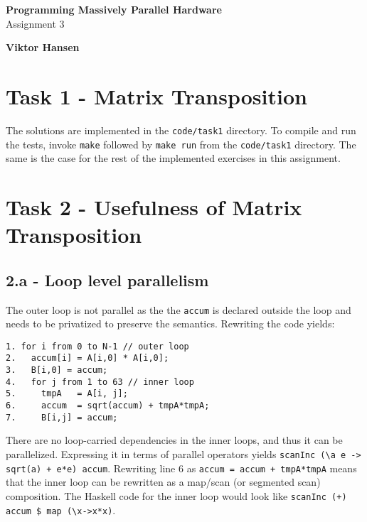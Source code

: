 \documentclass[11pt,a4paper,english]{article}
\begin{document}
\thispagestyle{empty} %
\hspace{6cm} \vspace{6cm}
\begin{center}
\textbf{\Huge {Programming Massively Parallel Hardware}}\\ \vspace{0.5cm}
\Large{Assignment 3}
\end{center}
\vspace{3cm}
\begin{center}
\Large{\textbf{Viktor Hansen}}
\end{center}
\vspace{6.0cm}
\thispagestyle{empty}

\newpage

\section*{Task 1 - Matrix Transposition}
The solutions are implemented in the \texttt{code/task1} directory. To compile and run the tests, invoke \texttt{make} followed by \texttt{make run} from the \texttt{code/task1} directory. The same is the case for the rest of the implemented exercises in this assignment.

\section*{Task 2 - Usefulness of Matrix Transposition}
\subsection*{2.a - Loop level parallelism}
The outer loop is not parallel as the the \texttt{accum} is declared outside the loop and needs to be privatized to preserve the semantics. Rewriting the code yields:

\captionsetup{justification=centering,margin=2cm}
\begin{verbatim}
1. for i from 0 to N-1 // outer loop
2.   accum[i] = A[i,0] * A[i,0];
3.   B[i,0] = accum;
4.   for j from 1 to 63 // inner loop
5.     tmpA   = A[i, j];
6.     accum  = sqrt(accum) + tmpA*tmpA;
7.     B[i,j] = accum;
\end{verbatim}

There are no loop-carried dependencies in the inner loops, and thus it can be parallelized. Expressing it in terms of parallel operators yields \texttt{scanInc (\textbackslash a e -> sqrt(a) + e*e) accum}. Rewriting line 6 as \texttt{accum = accum + tmpA*tmpA} means that the inner loop can be rewritten as a map/scan (or segmented scan) composition. The Haskell code for the inner loop would look like \texttt{scanInc (+) accum \$ map (\textbackslash x->x*x)}.
\end{document}
